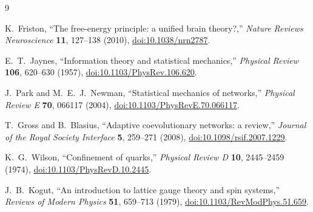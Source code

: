 \documentclass[11pt,letterpaper]{article}
\begin{document}
\begin{thebibliography}{9}

K.~Friston,
``The free-energy principle: a unified brain theory?,''
\emph{Nature Reviews Neuroscience} \textbf{11}, 127--138 (2010),
\href{https://doi.org/10.1038/nrn2787}{doi:10.1038/nrn2787}.

E.~T.~Jaynes,
``Information theory and statistical mechanics,''
\emph{Physical Review} \textbf{106}, 620--630 (1957),
\href{https://doi.org/10.1103/PhysRev.106.620}{doi:10.1103/PhysRev.106.620}.

J.~Park and M.~E.~J.~Newman,
``Statistical mechanics of networks,''
\emph{Physical Review E} \textbf{70}, 066117 (2004),
\href{https://doi.org/10.1103/PhysRevE.70.066117}{doi:10.1103/PhysRevE.70.066117}.

T.~Gross and B.~Blasius,
``Adaptive coevolutionary networks: a review,''
\emph{Journal of the Royal Society Interface} \textbf{5}, 259--271 (2008),
\href{https://doi.org/10.1098/rsif.2007.1229}{doi:10.1098/rsif.2007.1229}.

K.~G.~Wilson,
``Confinement of quarks,''
\emph{Physical Review D} \textbf{10}, 2445--2459 (1974),
\href{https://doi.org/10.1103/PhysRevD.10.2445}{doi:10.1103/PhysRevD.10.2445}.

J.~B.~Kogut,
``An introduction to lattice gauge theory and spin systems,''
\emph{Reviews of Modern Physics} \textbf{51}, 659--713 (1979),
\href{https://doi.org/10.1103/RevModPhys.51.659}{doi:10.1103/RevModPhys.51.659}.

\end{thebibliography}
\end{document}
